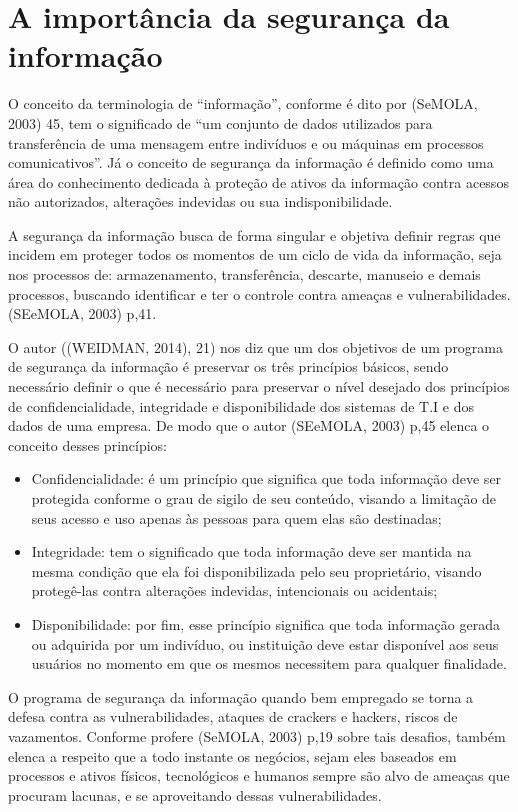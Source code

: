 \documentclass[
	12pt,				%
	openright,			%
	oneside,			%
	a4paper,			%
	english,			%
	french,				%
	spanish,			%
	brazil,				%
	]{abntex2}
\begin{document}
\section{A importância da segurança da informação }

O conceito da terminologia de “informação”, conforme é dito por  (SeMOLA, 2003) 45, tem o significado de “um conjunto de dados utilizados para transferência de uma mensagem entre indivíduos e ou máquinas em processos comunicativos”. Já o conceito de segurança da informação é definido como uma área do conhecimento dedicada à proteção de ativos da informação contra acessos não autorizados, alterações indevidas ou sua indisponibilidade.

A segurança da informação busca de forma singular e objetiva definir regras que incidem em proteger todos os momentos de um ciclo de vida da informação, seja nos processos de: armazenamento, transferência, descarte, manuseio e demais processos, buscando identificar e ter o controle contra ameaças e vulnerabilidades. (SEeMOLA, 2003)  p,41.

O autor ((WEIDMAN, 2014), 21) nos diz que um dos objetivos de um programa de segurança da informação é preservar os três princípios básicos, sendo necessário definir o que é necessário para preservar o nível desejado dos princípios de confidencialidade, integridade e disponibilidade dos sistemas de T.I e dos dados de uma empresa. De modo que o autor (SEeMOLA, 2003)  p,45 elenca o conceito desses princípios:

\begin{itemize}
\item Confidencialidade: é um princípio que significa que toda informação deve ser protegida conforme o grau de sigilo de seu conteúdo, visando a limitação de seus acesso e uso apenas às pessoas para quem elas são destinadas;
\item Integridade: tem o significado que toda informação deve ser mantida na mesma condição que ela foi disponibilizada pelo seu proprietário, visando protegê-las contra alterações indevidas, intencionais ou acidentais;
\item Disponibilidade: por fim, esse princípio significa que toda informação gerada ou adquirida por um indivíduo, ou instituição deve estar disponível aos seus usuários no momento em que os mesmos necessitem para qualquer finalidade.
\end{itemize}

O programa de segurança da informação quando bem empregado se torna a defesa contra as vulnerabilidades, ataques de crackers e hackers, riscos de vazamentos. Conforme profere (SeMOLA, 2003)  p,19 sobre tais desafios, também elenca a respeito que a todo instante os negócios, sejam eles baseados em processos e ativos físicos, tecnológicos e humanos sempre são alvo de ameaças que procuram lacunas, e se aproveitando dessas vulnerabilidades.
\end{document}
